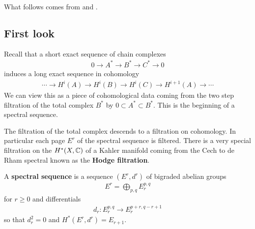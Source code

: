 What follows comes from \cite{griffiths-harris} and \cite{bott-tu}.
\subsection{First look}
Recall that a short exact sequence of chain complexes \begin{align*}
    0 \to A^* \to B^* \to C^* \to 0
\end{align*} induces a long exact sequence in cohomology \begin{align*}
    \cdots \to H^i(A) \to H^i(B) \to H^i(C) \to H^{i+1}(A) \to \cdots
\end{align*} We can view this as a piece of cohomological data coming from the 
two step filtration of the total complex $B^*$ by $0 \subset A^* \subset B^*$.
This is the beginning of a spectral sequence.

\hfill

The filtration of the total complex descends to a filtration on 
cohomology. In particular each page $E^r$ of the spectral sequence is
filtered. There is a very special filtration on the $H^*(X,\mathbb{C})$ of a Kahler manifold
coming from the Cech to de Rham spectral known as the \textbf{Hodge filtration}.
\begin{definition}
    A \textbf{spectral sequence} is a sequence $(E^r,d^r)$ of bigraded abelian groups \begin{align*}
        E^r = \bigoplus_{p,q} E^{p,q}_r
    \end{align*} for $r\geq 0$ and differentials \begin{align*}
        d_r: E^{p,q}_r \to E^{p+r,q-r+1}_r
    \end{align*} so that $d_r^2 = 0$ and $H^*(E^r,d^r) = E_{r+1}$.
\end{definition}
